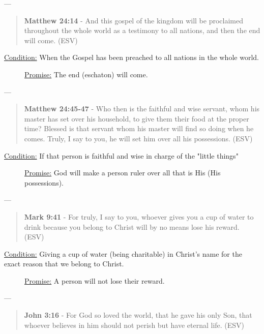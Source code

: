 \documentclass[11pt]{article}
\begin{document}
---

\begin{quote}
\textbf{Matthew 24:14} - And this gospel of the kingdom will be proclaimed throughout the whole world as a testimony to all nations, and then the end will come. (ESV)
\end{quote}

\begin{description}
\item[{\uline{Condition:} When the Gospel has been preached to all nations in the whole world.}] \uline{Promise:} The end (eschaton) will come.
\end{description}

---

\begin{quote}
\textbf{Matthew 24:45-47} - Who then is the faithful and wise servant, whom his master has set over his household, to give them their food at the proper time? Blessed is that servant whom his master will find so doing when he comes. Truly, I say to you, he will set him over all his possessions. (ESV)
\end{quote}

\begin{description}
\item[{\uline{Condition:} If that person is faithful and wise in charge of the "little things"}] \uline{Promise:} God will make a person ruler over all that is His (His possessions).
\end{description}

---

\begin{quote}
\textbf{Mark 9:41} - For truly, I say to you, whoever gives you a cup of water to drink because you belong to Christ will by no means lose his reward. (ESV)
\end{quote}

\begin{description}
\item[{\uline{Condition:} Giving a cup of water (being charitable) in Christ's name for the exact reason that we belong to Christ.}] \uline{Promise:} A person will not lose their reward.
\end{description}

---

\begin{quote}
\textbf{John 3:16} - For God so loved the world, that he gave his only Son, that whoever believes in him should not perish but have eternal life. (ESV)
\end{quote}
\end{document}
